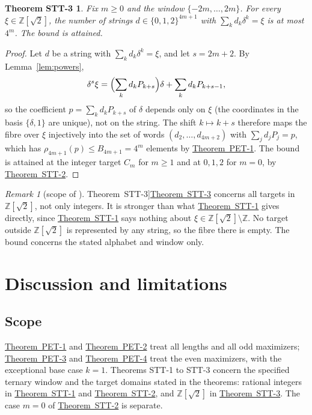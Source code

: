\documentclass[11pt]{amsart}
\theoremstyle{definition}
\theoremstyle{remark}
\newtheorem{remark}[lemma]{Remark}
\theoremstyle{plain}
\newtheorem*{thmSTTthree}{Theorem STT-3}
\numberwithin{equation}{section}
\newcommand{\Z}{\mathbb{Z}}
\newcommand{\PETone}{\hyperref[thm:pet1]{Theorem~PET-1}}
\newcommand{\PETtwo}{\hyperref[thm:pet2]{Theorem~PET-2}}
\newcommand{\PETthree}{\hyperref[thm:pet3]{Theorem~PET-3}}
\newcommand{\PETfour}{\hyperref[thm:pet4]{Theorem~PET-4}}
\newcommand{\STTone}{\hyperref[thm:stt1]{Theorem~STT-1}}
\newcommand{\STTtwo}{\hyperref[thm:stt2]{Theorem~STT-2}}
\newcommand{\STTthree}{\hyperref[thm:stt3]{Theorem~STT-3}}
\begin{document}
\begin{thmSTTthree}\label{thm:stt3}
Fix $m\ge0$ and the window $\{-2m,\dots,2m\}$. For every $\xi\in\Z[\sqrt2]$, the number of strings
$d\in\{0,1,2\}^{4m+1}$ with $\sum_kd_k\delta^k=\xi$ is at most $4^m$. The bound is attained.
\end{thmSTTthree}

\begin{proof}
Let $d$ be a string with $\sum_kd_k\delta^k=\xi$, and let $s=2m+2$. By Lemma~\ref{lem:powers},
\[
\delta^s\xi=\Bigl(\sum_kd_kP_{k+s}\Bigr)\delta+\sum_kd_kP_{k+s-1},
\]
so the coefficient $p=\sum_kd_kP_{k+s}$ of $\delta$ depends only on $\xi$ (the coordinates in the basis
$\{\delta,1\}$ are unique), not on the string. The shift $k\mapsto k+s$ therefore maps the fibre over
$\xi$ injectively into the set of words $(d_2,\dots,d_{4m+2})$ with $\sum_jd_jP_j=p$, which has
$\rho_{4m+1}(p)\le B_{4m+1}=4^m$ elements by \PETone. The bound is attained at the integer target
$C_m$ for $m\ge1$ and at $0,1,2$ for $m=0$, by \STTtwo.
\end{proof}

\begin{remark}[scope of \STTthree]\label{rem:scope11}
\STTthree{} concerns all targets in $\Z[\sqrt2]$, not only integers. It is stronger than what
\STTone{} gives directly, since \STTone{} says nothing about $\xi\in\Z[\sqrt2]\setminus\Z$. No target
outside $\Z[\sqrt2]$ is represented by any string, so the fibre there is empty. The bound concerns
the stated alphabet and window only.
\end{remark}

\section{Discussion and limitations}\label{sec:discussion}

\subsection{Scope}
\PETone{} and \PETtwo{} treat all lengths and all odd maximizers; \PETthree{} and \PETfour{} treat the
even maximizers, with the exceptional base case $k=1$. Theorems STT-1 to STT-3 concern the specified
ternary window and the target domains stated in the theorems: rational integers in \STTone{} and
\STTtwo, and $\Z[\sqrt2]$ in \STTthree. The case $m=0$ of \STTtwo{} is separate.
\end{document}
